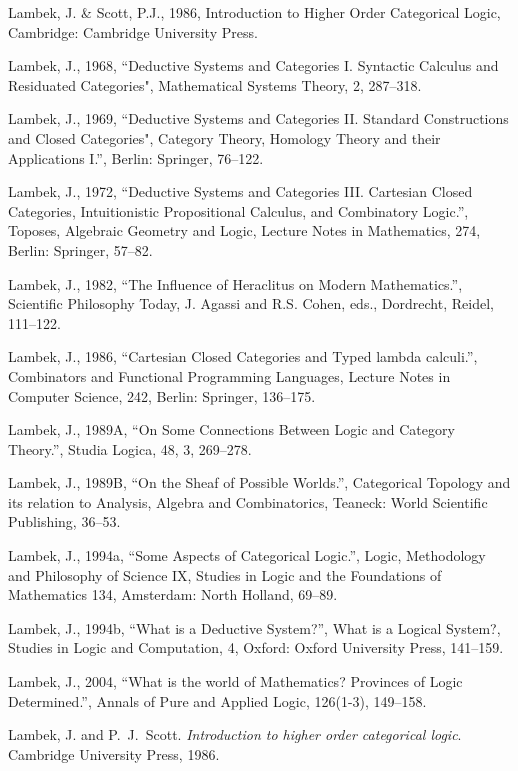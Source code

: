 \documentclass[12pt]{article}
\begin{document}
\begin{thebibliography}{399}
Lambek, J. \& Scott, P.J., 1986, Introduction to Higher Order Categorical Logic, Cambridge: Cambridge University Press. 

Lambek, J., 1968, ``Deductive Systems and Categories I. Syntactic Calculus and Residuated Categories", Mathematical Systems Theory, 2, 287--318. 

Lambek, J., 1969, ``Deductive Systems and Categories II. Standard Constructions and Closed Categories", Category Theory, Homology Theory and their Applications I.'', Berlin: Springer, 76--122. 

Lambek, J., 1972, ``Deductive Systems and Categories III. Cartesian Closed Categories, Intuitionistic Propositional Calculus, and Combinatory Logic.'', Toposes, Algebraic Geometry and Logic, Lecture Notes in Mathematics, 274, Berlin: Springer, 57--82.  

Lambek, J., 1982, ``The Influence of Heraclitus on Modern Mathematics.'', Scientific Philosophy Today, J. Agassi and R.S. Cohen, eds., Dordrecht, Reidel, 111--122.  

Lambek, J., 1986, ``Cartesian Closed Categories and Typed lambda calculi.'', Combinators and Functional Programming Languages, Lecture Notes in Computer Science, 242, Berlin: Springer, 136--175.   

Lambek, J., 1989A, ``On Some Connections Between Logic and Category Theory.'', Studia Logica, 48, 3, 269--278. 

Lambek, J., 1989B, ``On the Sheaf of Possible Worlds.'', Categorical Topology and its relation to Analysis, Algebra and Combinatorics, Teaneck: World Scientific Publishing, 36--53. 

Lambek, J., 1994a, ``Some Aspects of Categorical Logic.'', Logic, Methodology and Philosophy of Science IX, Studies in Logic and the Foundations of Mathematics 134, Amsterdam: North Holland, 69--89. 

Lambek, J., 1994b, ``What is a Deductive System?'', What is a Logical System?, Studies in Logic and Computation, 4, Oxford: Oxford University Press, 141--159.  
 
Lambek, J., 2004, ``What is the world of Mathematics? Provinces of Logic Determined.'', Annals of Pure and Applied Logic, 126(1-3), 149--158. 

Lambek, J. and P.~J.~Scott. {\em Introduction to higher order categorical logic}. Cambridge University Press, 1986.


\end{thebibliography}
\end{document}
